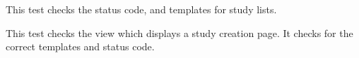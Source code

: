 \documentclass[letterpaper,10pt,english]{sphinxmanual}
\begin{document}
\begin{fulllineitems}
\begin{fulllineitems}
\end{fulllineitems}


\begin{fulllineitems}
\label{api:mousedb.data.tests.StudyViewTests.test_study_list}
This test checks the status code, and templates for study lists.

\end{fulllineitems}


\begin{fulllineitems}
\label{api:mousedb.data.tests.StudyViewTests.test_study_new}
This test checks the view which displays a study creation page.  It checks for the correct templates and status code.

\end{fulllineitems}


\end{fulllineitems}

\end{document}
